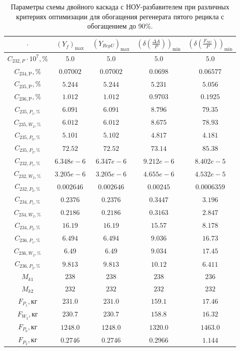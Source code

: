 \begin{table}
    \centering
    \begin{tabular}{|c|cccc|}
        \hline $\cdot$ & $(Y_f)_\text{max}$ & $(Y_{RepU})_\text{max}$ & $(\delta(\frac{\Delta A}{P}))_\text{min}$ & $(\delta(\frac{F_{NU}}{P}))_\text{min}$\\ \hline
    $C_{232,P}\cdot10^{7}, \%$ & $5.0$ & $5.0$ & $5.0$ & $5.0$\\ \hline
    $C_{234,\text{P}}, \%$  & $0.07002$ & $0.07002$ & $0.0698$ & $0.06577$\\ \hline
    $C_{235,\text{P}}, \%$  & $5.244$ & $5.244$ & $5.231$ & $5.056$\\ \hline
    $C_{236,\text{P}}, \%$  & $1.012$ & $1.012$ & $0.9703$ & $0.1925$\\ \hline
    $C_{235,P_1, \%}$     & $6.091$ & $6.091$ & $8.796$ & $79.35$\\ \hline
    $C_{235,W_2, \%}$     & $6.012$ & $6.012$ & $8.675$ & $78.93$\\ \hline
    $C_{235,P_0, \%}$     & $5.101$ & $5.102$ & $4.817$ & $4.181$\\ \hline
    $C_{235,P_2, \%}$     & $72.52$ & $72.52$ & $73.14$ & $85.38$\\ \hline
    $C_{232,P_1, \%}$     & $6.348e-6$ & $6.347e-6$ & $9.212e-6$ & $8.402e-5$\\ \hline
    $C_{232,W_2, \%}$     & $3.205e-6$ & $3.205e-6$ & $4.655e-6$ & $4.532e-5$\\ \hline
    $C_{232,P_2, \%}$     & $0.002646$ & $0.002646$ & $0.00245$ & $0.0006359$\\ \hline
    $C_{234,P_1, \%}$     & $0.2376$ & $0.2376$ & $0.3447$ & $3.196$\\ \hline
    $C_{234,W_2, \%}$     & $0.2186$ & $0.2186$ & $0.3163$ & $2.847$\\ \hline
    $C_{234,P_2, \%}$     & $16.19$ & $16.19$ & $15.57$ & $8.178$\\ \hline
    $C_{236,P_1, \%}$     & $6.494$ & $6.494$ & $9.036$ & $16.73$\\ \hline
    $C_{236,W_2, \%}$     & $6.49$ & $6.49$ & $9.034$ & $17.45$\\ \hline
    $C_{236,P_2, \%}$     & $9.813$ & $9.813$ & $10.12$ & $6.411$\\ \hline
    $M_{k1}$              & $238$ & $238$ & $238$ & $236$\\ \hline
    $M_{k2}$              & $232$ & $232$ & $232$ & $232$\\ \hline
    $F_{P_1}, \text{кг}$  & $231.0$ & $231.0$ & $159.1$ & $17.46$\\ \hline
    $F_{W_2}, \text{кг}$  & $230.7$ & $230.7$ & $158.8$ & $16.32$\\ \hline
    $F_{P_0}, \text{кг}$  & $1248.0$ & $1248.0$ & $1320.0$ & $1463.0$\\ \hline
    $F_{P_2}, \text{кг}$  & $0.2746$ & $0.2746$ & $0.2966$ & $1.144$\\ \hline
    \end{tabular}
\caption{Параметры схемы двойного каскада с НОУ-разбавителем при различных критериях оптимизации для обогащения регенерата пятого рецикла с обогащением до 90\%.{\label{2opt5_90}}}
\end{table}


